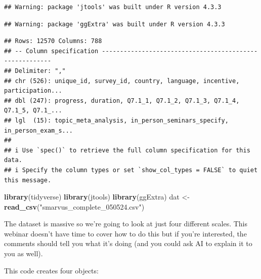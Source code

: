 \documentclass[
  oneside]{book}
\newenvironment{Shaded}{\begin{snugshade}}{\end{snugshade}}
\newcommand{\FunctionTok}[1]{\textcolor[rgb]{0.13,0.29,0.53}{\textbf{#1}}}
\newcommand{\NormalTok}[1]{#1}
\newcommand{\OtherTok}[1]{\textcolor[rgb]{0.56,0.35,0.01}{#1}}
\newcommand{\StringTok}[1]{\textcolor[rgb]{0.31,0.60,0.02}{#1}}
\begin{document}
\begin{verbatim}
## Warning: package 'jtools' was built under R version 4.3.3
\end{verbatim}

\begin{verbatim}
## Warning: package 'ggExtra' was built under R version 4.3.3
\end{verbatim}

\begin{verbatim}
## Rows: 12570 Columns: 788
## -- Column specification --------------------------------------------------------
## Delimiter: ","
## chr (526): unique_id, survey_id, country, language, incentive, participation...
## dbl (247): progress, duration, Q7.1_1, Q7.1_2, Q7.1_3, Q7.1_4, Q7.1_5, Q7.1_...
## lgl  (15): topic_meta_analysis, in_person_seminars_specify, in_person_exam_s...
## 
## i Use `spec()` to retrieve the full column specification for this data.
## i Specify the column types or set `show_col_types = FALSE` to quiet this message.
\end{verbatim}

\begin{Shaded}
\begin{Highlighting}[]
\FunctionTok{library}\NormalTok{(tidyverse)}
\FunctionTok{library}\NormalTok{(jtools)}
\FunctionTok{library}\NormalTok{(ggExtra)}
\NormalTok{dat }\OtherTok{\textless{}{-}} \FunctionTok{read\_csv}\NormalTok{(}\StringTok{"smarvus\_complete\_050524.csv"}\NormalTok{)}
\end{Highlighting}
\end{Shaded}

The dataset is massive so we're going to look at just four different scales. This webinar doesn't have time to cover how to do this but if you're interested, the comments should tell you what it's doing (and you could ask AI to explain it to you as well).

This code creates four objects:
\end{document}
